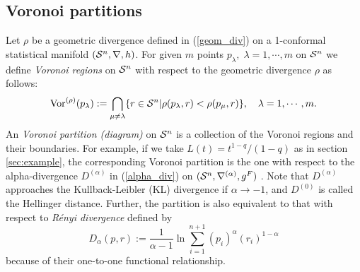 \documentclass{llncs}
\begin{document}
\subsection{Voronoi partitions}

Let $\rho$ be a geometric divergence defined in (\ref{geom_div}) on a 
1-conformal statistical manifold $({\cal S}^n,\nabla, h)$.
For given $m$ points $p_\lambda, \; \lambda=1, \cdots, m$ on ${\cal S}^n$ 
we define {\em Voronoi regions} on ${\cal S}^n$ with respect to
the geometric divergence $\rho$ as follows:
\[
	{\rm Vor}^{(\rho)}(p_\lambda):=\bigcap_{\mu \not= \lambda} 
	\{ r \in {\cal S}^n | 
	\rho(p_\lambda,r)< \rho(p_\mu,r) \},
	\quad \lambda=1,\cdots,m.
\]
An {\em Voronoi partition (diagram)} on 
${\cal S}^n$ is a collection of the Voronoi regions and their boundaries.
For example, if we take $L(t)=t^{1-q}/(1-q)$ as in section \ref{sec:example}, 
the corresponding Voronoi partition is the one with respect to the 
alpha-divergence $D^{(\alpha)}$ in (\ref{alpha_div}) on 
$({\cal S}^n, \nabla^{(\alpha)},g^F)$ \cite{OMA12}.
Note that $D^{(\alpha)}$ approaches the Kullback-Leibler (KL) divergence 
if $\alpha \rightarrow -1$, and $D^{(0)}$ is called 
the Hellinger distance.
Further, the partition is also equivalent to that with respect to 
{\em R\'enyi divergence} \cite{Renyi} %
defined by
\[
	D_\alpha(p,r):= \frac{1}{\alpha-1} \ln 
		\sum_{i=1}^{n+1} (p_i)^{\alpha} (r_i)^{1-\alpha}
\]
because of their one-to-one functional relationship.
\end{document}
